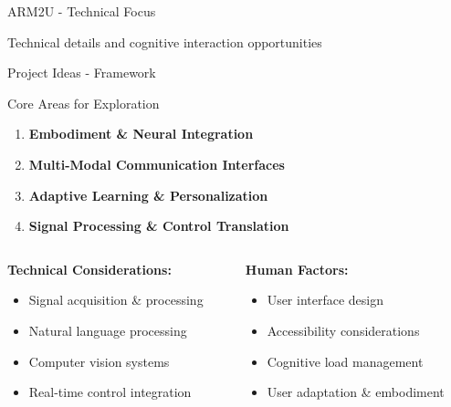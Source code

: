 \documentclass{beamer}
\begin{document}
\begin{frame}{ARM2U - Technical Focus}
    \vspace{2cm}

    \begin{center}
        \Large
        Technical details and cognitive interaction opportunities\\[0.5cm]
    \end{center}

    \vspace{2cm}
\end{frame}

\begin{frame}{Project Ideas - Framework}
    \begin{block}{Core Areas for Exploration}
        \begin{enumerate}
            \item \textbf{Embodiment \& Neural Integration}
            \item \textbf{Multi-Modal Communication Interfaces}
            \item \textbf{Adaptive Learning \& Personalization}
            \item \textbf{Signal Processing \& Control Translation}
        \end{enumerate}
    \end{block}

    \vspace{0.3cm}

    \begin{columns}[T]
        \begin{column}{0.5\textwidth}
            \textbf{Technical Considerations:}
            \begin{itemize}
                \item Signal acquisition \& processing
                \item Natural language processing
                \item Computer vision systems
                \item Real-time control integration
            \end{itemize}
        \end{column}

        \begin{column}{0.5\textwidth}
            \textbf{Human Factors:}
            \begin{itemize}
                \item User interface design
                \item Accessibility considerations
                \item Cognitive load management
                \item User adaptation \& embodiment
            \end{itemize}
        \end{column}
    \end{columns}
\end{frame}
\end{document}
